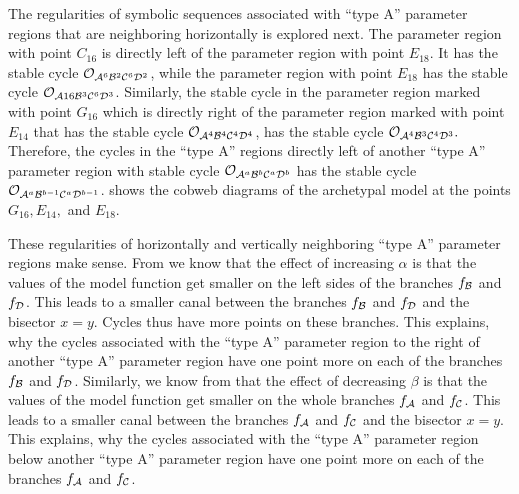 The regularities of symbolic sequences associated with ``type A'' parameter regions that are neighboring horizontally is explored next.
The parameter region with point $C_{16}$ is directly left of the parameter region with point $E_{18}$.
It has the stable cycle $\mathcal{O}_{\mathcal{A}^6\mathcal{B}^2\mathcal{C}^6\mathcal{D}^2}$, while the parameter region with point $E_{18}$ has the stable cycle $\mathcal{O}_{\mathcal{A}16\mathcal{B}^3\mathcal{C}^6\mathcal{D}^3}$.
Similarly, the stable cycle in the parameter region marked with point $G_{16}$ which is directly right of the parameter region marked with point $E_{14}$ that has the stable cycle $\mathcal{O}_{\mathcal{A}^4\mathcal{B}^4\mathcal{C}^4\mathcal{D}^4}$, has the stable cycle $\mathcal{O}_{\mathcal{A}^4\mathcal{B}^3\mathcal{C}^4\mathcal{D}^3}.$
Therefore, the cycles in the ``type A'' regions directly left of another ``type A'' parameter region with stable cycle $\mathcal{O}_{\mathcal{A}^a\mathcal{B}^b\mathcal{C}^a\mathcal{D}^b}$ has the stable cycle $\mathcal{O}_{\mathcal{A}^a\mathcal{B}^{b-1}\mathcal{C}^a\mathcal{D}^{b-1}}$.
 shows the cobweb diagrams of the archetypal model at the points $G_{16}, E_{14},$ and $E_{18}$.

These regularities of horizontally and vertically neighboring ``type A'' parameter regions make sense.
From  we know that the effect of increasing $\alpha$ is that the values of the model function get smaller on the left sides of the branches $f_{\mathcal{B}}$ and $f_{\mathcal{D}}$.
This leads to a smaller canal between the branches $f_{\mathcal{B}}$ and $f_{\mathcal{D}}$ and the bisector $x = y$.
Cycles thus have more points on these branches.
This explains, why the cycles associated with the ``type A'' parameter region to the right of another ``type A'' parameter region have one point more on each of the branches $f_{\mathcal{B}}$ and $f_{\mathcal{D}}$.
Similarly, we know from  that the effect of decreasing $\beta$ is that the values of the model function get smaller on the whole branches $f_{\mathcal{A}}$ and $f_{\mathcal{C}}$.
This leads to a smaller canal between the branches $f_{\mathcal{A}}$ and $f_{\mathcal{C}}$ and the bisector $x = y$.
This explains, why the cycles associated with the ``type A'' parameter region below another ``type A'' parameter region have one point more on each of the branches $f_{\mathcal{A}}$ and $f_{\mathcal{C}}$.
